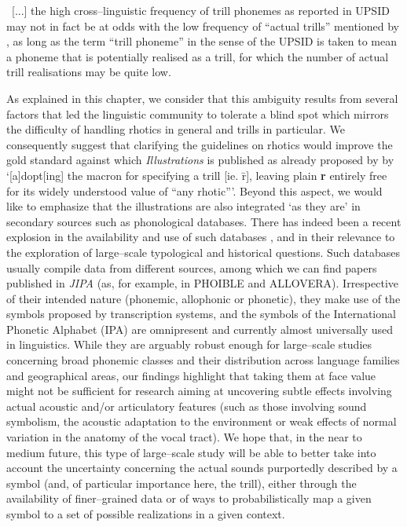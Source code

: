\begin{displayquote}
~[...] the high cross–linguistic frequency of trill phonemes as reported in UPSID may not in fact be at odds with the low frequency of “actual trills” mentioned by \parencite{ladefogedLateralsTrills1977}, as long as the term “trill phoneme” in the sense of the UPSID is taken to mean a phoneme that is potentially realised as a trill, for which the number of actual trill realisations may be quite low. \parencite[157]{sebregtsSociophoneticsPhonologyDutch2014}
\end{displayquote}

As explained in this chapter, we consider that this ambiguity results from several factors that led the linguistic community to tolerate a blind spot which mirrors the difficulty of handling rhotics in general and trills in particular. We consequently suggest that clarifying the guidelines on rhotics would improve the gold standard against which \textit{Illustrations} is published as already proposed by \parencite[84]{whitleyRhoticRepresentationProblems2003} by ‘[a]dopt[ing] the macron for specifying a trill [ie. r̄], leaving plain \textbf{r} entirely free for its widely understood value of “any rhotic”’. Beyond this aspect, we would like to emphasize that the illustrations are also integrated ‘as they are’ in secondary sources such as phonological databases. There has indeed been a recent explosion in the availability and use of such databases \parencites{phoible,mortensenAlloVeraMultilingualAllophone2020}, and in their relevance to the exploration of large–scale typological and historical questions. Such databases usually compile data from different sources, among which we can find papers published in \textit{JIPA} (as, for example, in PHOIBLE and ALLOVERA). Irrespective of their intended nature (phonemic, allophonic or phonetic), they make use of the symbols proposed by transcription systems, and the symbols of the International Phonetic Alphabet (IPA) are omnipresent and currently almost universally used in linguistics. While they are arguably robust enough for large–scale studies concerning broad phonemic classes and their distribution across language families and geographical areas, our findings highlight that taking them at face value might not be sufficient for research aiming at uncovering subtle effects involving actual acoustic and/or articulatory features (such as those involving sound symbolism, the acoustic adaptation to the environment or weak effects of normal variation in the anatomy of the vocal tract). We hope that, in the near to medium future, this type of large–scale study will be able to better take into account the uncertainty concerning the actual sounds purportedly described by a symbol (and, of particular importance here, the trill), either through the availability of finer–grained data or of ways to probabilistically map a given symbol to a set of possible realizations in a given context. \\ 

